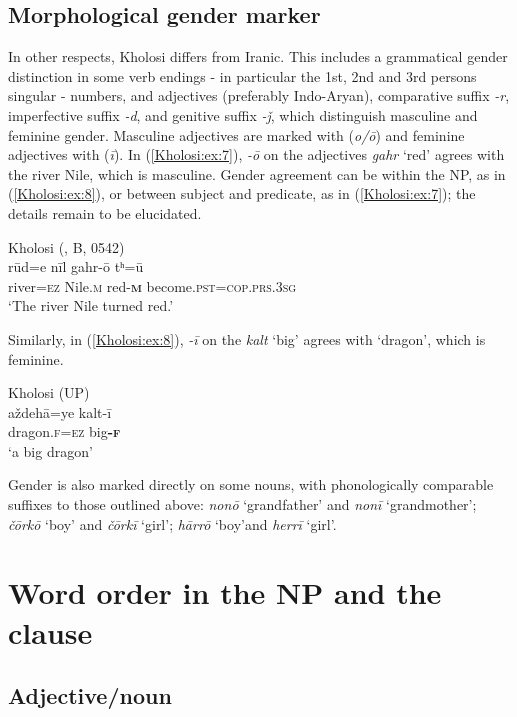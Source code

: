 \documentclass[output=paper,colorlinks,citecolor=brown]{langscibook}
\begin{document}
\subsection{Morphological gender marker}\label{Kholosi:ss:2.4}

In other respects, Kholosi differs from Iranic. This includes a grammatical gender distinction in some verb endings - in particular the 1st, 2nd and 3rd persons singular - numbers, and adjectives (preferably Indo-Aryan), comparative suffix \textit{-r}, imperfective suffix \textit{-d}, and genitive suffix \textit{-ǰ}, which distinguish masculine and feminine gender. Masculine adjectives are marked with (\textit{o/ō}) and feminine adjectives with (\textit{ī}). In (\ref{Kholosi:ex:7}), \textit{-ō} on the adjectives \textit{gahr} `red' agrees with the river Nile, which is masculine. Gender agreement can be within the NP, as in (\ref{Kholosi:ex:8}), or between subject and predicate, as in (\ref{Kholosi:ex:7}); the details remain to be elucidated.

\ea\label{Kholosi:ex:7}
Kholosi (\citealt{nourzaei_kholosi_2022}, B, 0542)\\
\gll rūd=e nīl gahr-ō tʰ=ū \\
river\textsc{=ez} {N}ile\textsc{.m} red\textsc{-\textbf{m}} become\textsc{.pst=cop.prs.3sg} \\
\glt `The river Nile turned red.' 
\z

Similarly, in (\ref{Kholosi:ex:8}), \textit{-ī} on the  \textit{kalt} `big' agrees with `dragon', which is feminine. 

\ea\label{Kholosi:ex:8}
Kholosi (UP)\\
\gll aždehā=ye kalt-ī \\
dragon\textsc{.f=ez} big\textsc{\textbf{-f}} \\
\glt `a big dragon'
\z

Gender is also marked directly on some nouns, with phonologically comparable suffixes to those outlined above: \textit{nonō} `grandfather' and \textit{nonī} `grandmother'; \textit{čōrkō} `boy' and \textit{čōrkī} `girl'; \textit{hārrō} `boy'and \textit{herrī} `girl'.

\section{Word order in the NP and the clause}\label{Kholosi:ss:3}

\subsection{Adjective/noun}\label{Kholosi:ss:3.1}
\end{document}
